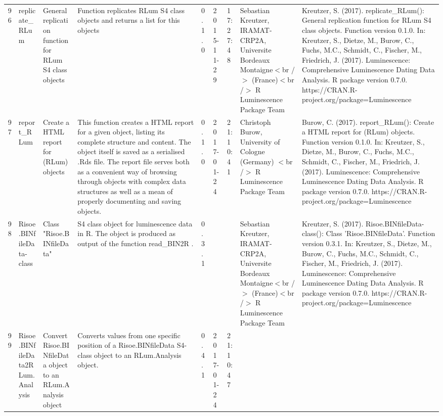 \begin{table}[ht]
\begin{tabular}{rllllllll}
 \\ 
  96 & replicate\_RLum & General replication function for RLum S4 class objects & Function replicates RLum S4 class objects and returns a list for this objects & 0.1.0 & 2015-11-29 & 17:27:48
 & Sebastian Kreutzer, IRAMAT-CRP2A, Universite Bordeaux Montaigne$<$br /$>$ (France)$<$br /$>$  R Luminescence Package Team & Kreutzer, S. (2017). replicate\_RLum(): General replication function for RLum S4 class objects. Function version 0.1.0. In: Kreutzer, S., Dietze, M., Burow, C., Fuchs, M.C., Schmidt, C., Fischer, M., Friedrich, J. (2017). Luminescence: Comprehensive Luminescence Dating Data Analysis. R package version 0.7.0. https://CRAN.R-project.org/package=Luminescence
 \\ 
  97 & report\_RLum & Create a HTML report for (RLum) objects & This function creates a HTML report for a given object, listing its complete structure and content. The object itself is saved as a serialised .Rds file. The report file serves both as a convenient way of browsing through objects with  complex data structures as well as a mean of properly documenting and saving objects. & 0.1.0 & 2017-01-24 & 21:10:41
 & Christoph Burow, University of Cologne (Germany)  $<$br /$>$  R Luminescence Package Team & Burow, C. (2017). report\_RLum(): Create a HTML report for (RLum) objects. Function version 0.1.0. In: Kreutzer, S., Dietze, M., Burow, C., Fuchs, M.C., Schmidt, C., Fischer, M., Friedrich, J. (2017). Luminescence: Comprehensive Luminescence Dating Data Analysis. R package version 0.7.0. https://CRAN.R-project.org/package=Luminescence
 \\ 
  98 & Risoe.BINfileData-class & Class  "Risoe.BINfileData" & S4 class object for luminescence data in R. The object is produced as output of the function  read\_BIN2R . & 0.3.1
 &  &  & Sebastian Kreutzer, IRAMAT-CRP2A, Universite Bordeaux Montaigne$<$br /$>$ (France)$<$br /$>$  R Luminescence Package Team & Kreutzer, S. (2017). Risoe.BINfileData-class(): Class 'Risoe.BINfileData'. Function version 0.3.1. In: Kreutzer, S., Dietze, M., Burow, C., Fuchs, M.C., Schmidt, C., Fischer, M., Friedrich, J. (2017). Luminescence: Comprehensive Luminescence Dating Data Analysis. R package version 0.7.0. https://CRAN.R-project.org/package=Luminescence
 \\ 
  99 & Risoe.BINfileData2RLum.Analysis & Convert Risoe.BINfileData object to an RLum.Analysis object & Converts values from one specific position of a Risoe.BINfileData S4-class object to an RLum.Analysis object. & 0.4.1 & 2017-01-24 & 21:10:47

\end{tabular}
\end{table}
